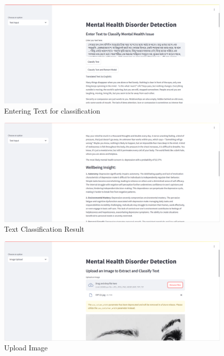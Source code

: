\begin{figure}[h!]  
    \centering
    \includegraphics[width=1.0\textwidth]{App Images/02 Interface.png}  
    \caption{Entering Text for classification}
    \label{02i}  %
\end{figure}

\begin{figure}[h!]  
    \centering
    \includegraphics[width=1.0\textwidth]{App Images/03 Interface.png}  
    \caption{Text Classification Result}
    \label{03i}  %
\end{figure}

\pagebreak

\begin{figure}[h!]  
    \centering
    \includegraphics[width=1.0\textwidth]{App Images/04 Interface.png}  
    \caption{Upload Image}
    \label{04i}  %
\end{figure}


